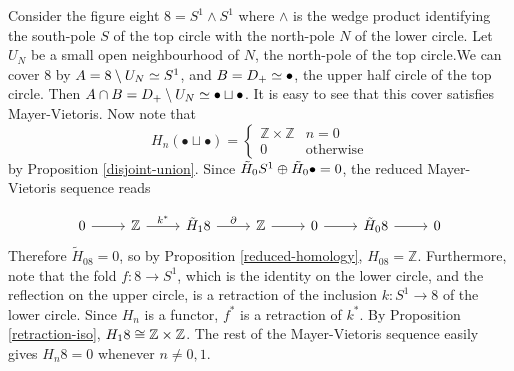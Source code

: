 \begin{example}
Consider the figure eight $8=S^1\wedge S^1$ where $\wedge$ is the wedge product identifying the south-pole $S$ of the top circle with the north-pole $N$ of the lower circle. Let $U_N$ be a small open neighbourhood of $N$, the north-pole of the top circle.We can cover $8$ by $A=8\setminus U_N\simeq S^1$, and $B=D_+\simeq \bullet$, the upper half circle of the top circle. Then $A\cap B= D_+\setminus U_N\simeq \bullet \sqcup \bullet$. It is easy to see that this cover satisfies Mayer-Vietoris. Now note that $$H_n(\bullet \sqcup \bullet)=\begin{cases}\mathbb{Z}\times\mathbb{Z} & n=0\\ 0 & \text{otherwise}\end{cases}$$ by Proposition \ref{disjoint-union}. Since $\tilde{H}_0S^1\oplus \tilde{H}_0\bullet=0$, the reduced Mayer-Vietoris sequence reads 

\[\begin{tikzcd}
0 \arrow[r] & \mathbb{Z} \arrow[r, "k^*"] & \tilde{H}_18 \arrow[r, "\partial"] & \mathbb{Z} \arrow[r] & 0 \arrow[r] & \tilde{H}_08 \arrow[r] & 0
\end{tikzcd}\]
Therefore $\tilde{H}_08=0$, so by Proposition \ref{reduced-homology}, $H_08=\mathbb{Z}$. Furthermore, note that the fold $f:8\rightarrow S^1$, which is the identity on the lower circle, and the reflection on the upper circle, is a retraction of the inclusion $k:S^1\rightarrow 8$ of the lower circle. Since $H_n$ is a functor, $f^*$ is a retraction of $k^*$. By Proposition \ref{retraction-iso}, $H_18\cong \mathbb{Z}\times\mathbb{Z}$. The rest of the Mayer-Vietoris sequence easily gives $H_n8=0$ whenever $n\neq 0,1$.


\end{example}
